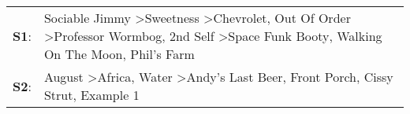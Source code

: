 \begin{supertabular}{p{0.03\textwidth}p{0.92\textwidth}}
 \textbf{S1}:  &  Sociable Jimmy\textsuperscript{} \textgreater \enspace Sweetness\textsuperscript{} \textgreater \enspace Chevrolet\textsuperscript{}, \enspace Out Of Order\textsuperscript{} \textgreater \enspace Professor Wormbog\textsuperscript{}, \enspace 2nd Self\textsuperscript{} \textgreater \enspace Space Funk Booty\textsuperscript{}, \enspace Walking On The Moon\textsuperscript{}, \enspace Phil's Farm\textsuperscript{}  \enspace  \\
 \textbf{S2}:  &                                                                                                                                       August\textsuperscript{} \textgreater \enspace Africa\textsuperscript{}, \enspace Water\textsuperscript{} \textgreater \enspace Andy's Last Beer\textsuperscript{}, \enspace Front Porch\textsuperscript{}, \enspace Cissy Strut\textsuperscript{}, \enspace Example 1\textsuperscript{}  \enspace  \\
\end{supertabular}
